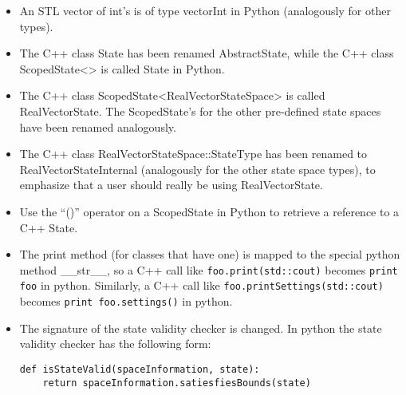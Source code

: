 \begin {itemize}
\item An STL vector of int's is of type vectorInt in Python (analogously for
other types).
\item The C++ class State has been renamed AbstractState, while the C++ class
ScopedState<> is called State in Python.
\item The C++ class ScopedState<RealVectorStateSpace> is called RealVectorState.
The ScopedState's for the other pre-defined state spaces have been renamed
analogously.
\item The C++ class RealVectorStateSpace::StateType has been renamed to
RealVectorStateInternal (analogously for the other state space types), to
emphasize that a user should really be using RealVectorState.
\item Use the ``()'' operator on a ScopedState in Python to retrieve a reference
to a C++ State.
\item The print method (for classes that have one) is mapped to the special
python method \_\_str\_\_, so a C++ call like {\tt foo.print(std::cout)} becomes
{\tt print foo} in python. Similarly, a C++ call like
{\tt foo.printSettings(std::cout)} becomes {\tt print foo.settings()} in python.
\item The signature of the state validity checker is changed. In python the
state validity checker has the following form:
\begin {verbatim}
def isStateValid(spaceInformation, state):
    return spaceInformation.satiesfiesBounds(state)
\end {verbatim}

\end {itemize}

